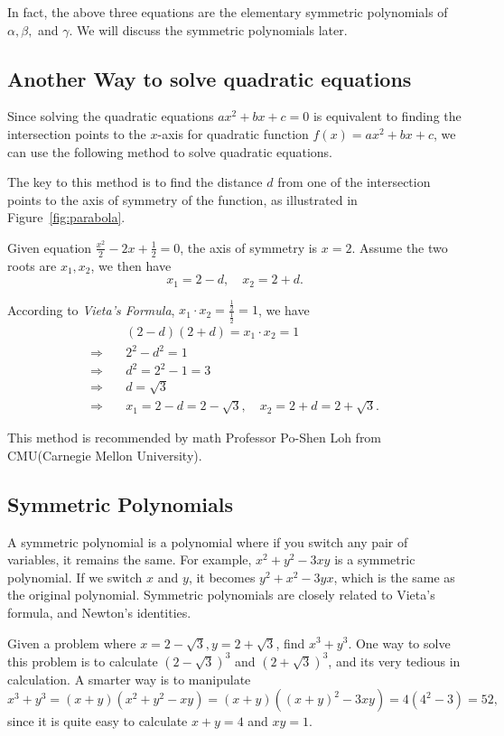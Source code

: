\documentclass[11pt, oneside]{article}   	%
\begin{document}
In fact, the above three equations are the elementary symmetric polynomials of $\alpha, \beta, $ and $\gamma$. We will discuss the symmetric polynomials later.

\subsection{Another Way to solve quadratic equations}
Since solving the quadratic equations $ax^2+bx+c=0$ is equivalent to finding the intersection points to the $x$-axis for quadratic function $f(x)=ax^2+bx+c$, we can use the following method to solve quadratic equations.


The key to this method is to find  the distance $d$ from one of the intersection points to the axis of symmetry of the function, as illustrated in Figure~\ref{fig:parabola}.

Given equation $\frac{x^2}{2}-2x+\frac{1}{2}=0$, the axis of symmetry is $x=2$. Assume the two roots are $x_1, x_2$, we then have \[x_1=2-d, \quad x_2= 2+d.\]

According to \emph{Vieta's Formula}, $x_1 \cdot x_2= \frac{\frac{1}{2}}{\frac{1}{2}}=1$, we have 
\begin{align*}
&(2-d)(2+d)=x_1 \cdot x_2 =1\\
\Rightarrow\quad&2^2-d^2=1\\
\Rightarrow\quad&d^2=2^2-1=3\\
\Rightarrow\quad&d=\sqrt{3}\\
\Rightarrow\quad&x_1=2-d=2-\sqrt{3},\quad x_2=2+d=2+\sqrt{3}.
\end{align*}

This method is recommended by math Professor Po-Shen Loh from CMU(Carnegie Mellon University).

\newpage
\subsection{Symmetric Polynomials}
A symmetric polynomial is a polynomial where if you switch any pair of variables, it remains the same.
For example, $x^2+y^2-3xy$ is a symmetric polynomial. If we switch $x$ and $y$, it becomes $y^2 + x ^2 - 3yx$, which is the same as the original polynomial. Symmetric polynomials are closely related to Vieta's formula, and Newton's identities.

Given a problem where $x=2-\sqrt{3}, y=2+\sqrt{3}$, find $x^3 + y^3$. One way to solve this problem is to calculate $(2-\sqrt{3})^3$ and $(2+\sqrt{3})^3$, and its very tedious in calculation. A smarter way is to manipulate 
\[x^3+y^3=(x+y)(x^2+y^2-xy)=(x+y)((x+y)^2-3xy)=4(4^2-3)=52,\]
since it is quite easy to calculate $x+y=4$ and $xy=1$.
\end{document}
